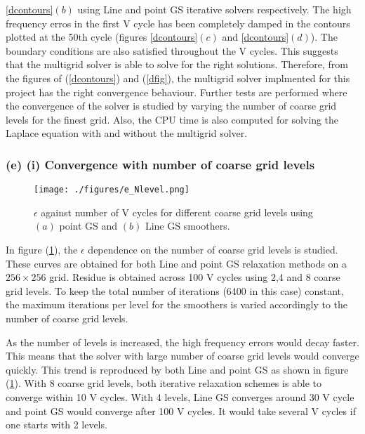 \documentclass[11pt]{report}
\begin{document}
\ref{dcontours}$(b)$ using Line and point GS iterative solvers respectively. The high frequency erros in the first V cycle has been completely damped in the contours plotted at the 50th cycle  (figures \ref{dcontours}$(c)$ and 
\ref{dcontours}$(d)$). The boundary conditions are also satisfied throughout the V cycles. This suggests that the multigrid solver is able to solve for the right solutions. 
Therefore, from the figures of (\ref{dcontours}) and (\ref{dfig}), the multigrid solver implmented for this project has the right convergence behaviour. Further tests are performed where the convergence of the solver is studied by varying the number of coarse grid levels for the finest grid. Also, the CPU time is also computed for solving the Laplace equation with and without the multigrid solver. 
\subsubsection{(e) (i) Convergence with number of coarse grid levels}
\begin{figure}[H]
	\begin{center}
		\texttt{[image: ./figures/e\_Nlevel.png]}
	\end{center}
\caption{$\epsilon$ against number of V cycles for different coarse grid levels using $(a)$ point GS and $(b)$ Line GS smoothers.}\label{Nlevel}
\end{figure}
In figure (\ref{Nlevel}), the $\epsilon$ dependence on the number of coarse grid levels is studied. These curves are obtained for both Line and point GS relaxation methods on a $256\times256$ grid. Residue is obtained 
across 100 V cycles using 2,4 and 8 coarse grid levels. To keep the total number of iterations (6400 in this case) constant, the maximum iterations per level for the smoothers is varied accordingly to the number of coarse grid  levels. 

As the number of levels is increased, the high frequency errors would decay faster. This means that the solver 
with large number of coarse grid levels would converge quickly. This trend is reproduced by both Line and point 
GS as shown in figure (\ref{Nlevel}). With 8 coarse grid levels, both iterative relaxation schemes is able to 
converge within 10 V cycles. With 4 levels, Line GS converges around 30 V cycle and point GS would converge 
after 100 V cycles. It would take several V cycles if one starts with 2 levels. 
\end{document}
